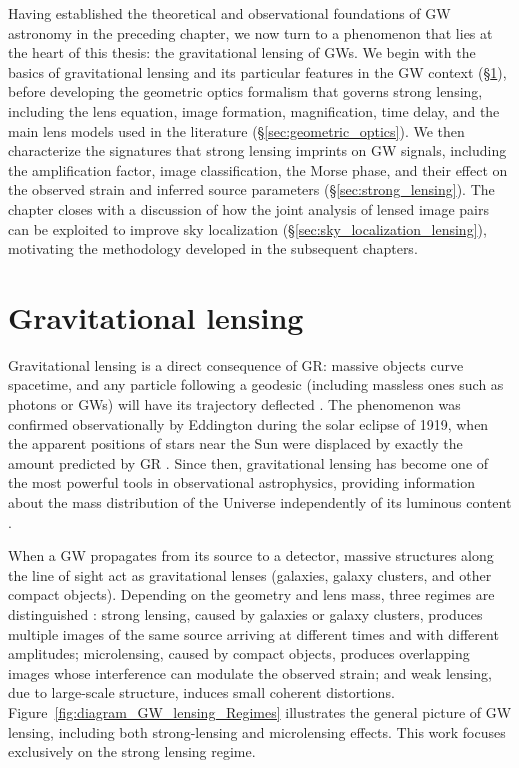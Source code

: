 Having established the theoretical and observational foundations of GW astronomy in the preceding chapter, we now turn to a phenomenon that lies at the heart of this thesis: the gravitational lensing of GWs. We begin with the basics of gravitational lensing and its particular features in the GW context (\S\ref{sec:lensing_intro}), before developing the geometric optics formalism that governs strong lensing, 
including the lens equation, image formation, magnification, 
time delay, and the main lens models used in the literature 
(\S\ref{sec:geometric_optics}). We then characterize the 
signatures that strong lensing imprints on GW signals, 
including the amplification factor, image classification, the Morse phase, and their effect on the observed strain and 
inferred source parameters (\S\ref{sec:strong_lensing}). The 
chapter closes with a discussion of how the joint analysis of lensed image pairs can be exploited to improve sky localization (\S\ref{sec:sky_localization_lensing}), motivating the methodology developed in the subsequent chapters.


\section{Gravitational lensing}
\label{sec:lensing_intro}

Gravitational lensing is a direct consequence of GR: massive objects curve spacetime, and any particle following a geodesic (including massless ones such as photons or GWs) will have its trajectory deflected \cite{EM_lensing,GW_lensing_original, Lensing_phase_effects}. The phenomenon was confirmed observationally by Eddington during the solar eclipse of 1919, when the apparent positions of stars near the Sun were displaced by exactly the amount predicted by 
GR \cite{Eddingtonsexpedition}. Since then, gravitational lensing has become one of the most powerful tools in observational astrophysics, providing information about the mass distribution of the Universe independently of its luminous content \cite{Lensing_in_astronomy}.

When a GW propagates from its source to a detector, massive 
structures along the line of sight act as gravitational lenses (galaxies, galaxy clusters,
and other compact objects). Depending on the geometry and lens mass, three regimes are distinguished \cite{lensing_regimes}: strong lensing, caused by galaxies or galaxy clusters, produces multiple images of the same source arriving at different times and with different amplitudes; microlensing, caused by compact objects, produces overlapping images whose interference can modulate the observed strain; and weak lensing, due to large-scale structure, induces small coherent distortions. Figure~\ref{fig:diagram_GW_lensing_Regimes} illustrates the general picture of GW lensing, including both strong-lensing and microlensing effects. This work focuses exclusively on the strong lensing regime.

